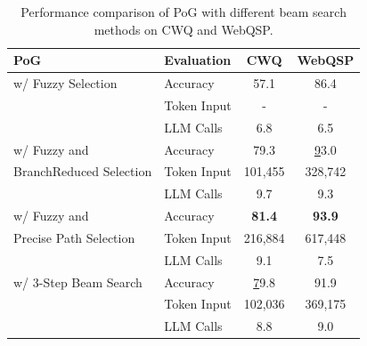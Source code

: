 \begin{table}[h]
\caption{Performance comparison of PoG with different beam search methods on CWQ and WebQSP.}\label{fig:ablation:vary_beamsearch}
\begin{tabular}{@{}llcc@{}}
\toprule
\textbf{PoG}              & \textbf{Evaluation} & \textbf{CWQ}  & \textbf{WebQSP} \\ \midrule
w/ Fuzzy Selection        & Accuracy           & 57.1          & 86.4           \\
                          & Token Input         & -             & -               \\
                          & LLM Calls       & 6.8           & 6.5             \\ \midrule
w/ Fuzzy and              & Accuracy           & 79.3          & {\ul 93.0}     \\
BranchReduced Selection & Token Input         & 101,455       & 328,742         \\
                          & LLM Calls       & 9.7         & 9.3             \\ \midrule
w/ Fuzzy and              & Accuracy           & \textbf{81.4} & \textbf{93.9}   \\
Precise Path Selection    & Token Input         & 216,884       & 617,448         \\
                          & LLM Calls       & 9.1           & 7.5             \\ \midrule
w/ 3-Step Beam Search    & Accuracy           & {\ul 79.8}    & 91.9            \\
                          & Token Input         & 102,036       & 369,175         \\
                          & LLM Calls       & 8.8           & 9.0               \\ \bottomrule
\end{tabular}
\end{table}

